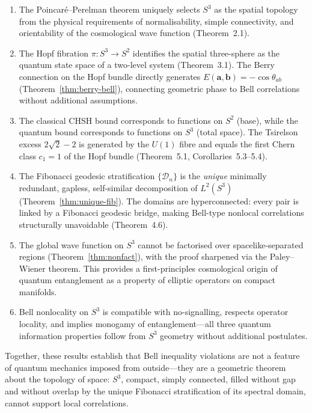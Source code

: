 \documentclass[12pt,a4paper]{article}
\theoremstyle{definition}
\theoremstyle{remark}
\begin{document}
\begin{enumerate}
\item The Poincar\'e--Perelman theorem uniquely selects $S^3$ as the spatial topology
from the physical requirements of normalisability, simple connectivity, and
orientability of the cosmological wave function (Theorem~2.1).

\item The Hopf fibration $\pi: S^3\to S^2$ identifies the spatial three-sphere as
the quantum state space of a two-level system (Theorem~3.1). The Berry connection on
the Hopf bundle directly generates $E(\mathbf{a},\mathbf{b}) = -\cos\theta_{ab}$
(Theorem~\ref{thm:berry-bell}), connecting geometric phase to Bell correlations
without additional assumptions.

\item The classical CHSH bound corresponds to functions on $S^2$ (base), while the
quantum bound corresponds to functions on $S^3$ (total space). The Tsirelson excess
$2\sqrt{2}-2$ is generated by the $U(1)$ fibre and equals the first Chern class
$c_1 = 1$ of the Hopf bundle (Theorem~5.1, Corollaries~5.3--5.4).

\item The Fibonacci geodesic stratification $\{\mathcal{D}_n\}$ is the \emph{unique}
minimally redundant, gapless, self-similar decomposition of $L^2(S^3)$
(Theorem~\ref{thm:unique-fib}). The domains are hyperconnected: every pair is linked
by a Fibonacci geodesic bridge, making Bell-type nonlocal correlations structurally
unavoidable (Theorem~4.6).

\item The global wave function on $S^3$ cannot be factorised over spacelike-separated
regions (Theorem~\ref{thm:nonfact}), with the proof sharpened via the Paley--Wiener
theorem. This provides a first-principles cosmological origin of quantum entanglement
as a property of elliptic operators on compact manifolds.

\item Bell nonlocality on $S^3$ is compatible with no-signalling, respects operator
locality, and implies monogamy of entanglement---all three quantum information
properties follow from $S^3$ geometry without additional postulates.
\end{enumerate}

Together, these results establish that Bell inequality violations are not a feature
of quantum mechanics imposed from outside---they are a geometric theorem about the
topology of space: $S^3$, compact, simply connected, filled without gap and without
overlap by the unique Fibonacci stratification of its spectral domain, cannot support
local correlations.
\end{document}
